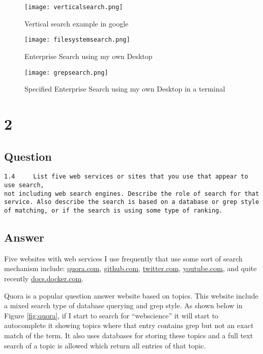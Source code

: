 \documentclass[letterpaper,11pt]{article}
\begin{document}
   \begin{figure}[h]
  \centering
  \texttt{[image: verticalsearch.png]}
  \caption{Vertical search example in google}
  \label{fig:verticalsearch}
  \end{figure}

   \clearpage
  \begin{figure}[h]
  \centering
  \texttt{[image: filesystemsearch.png]}
  \caption{Enterprise Search using my own Desktop}
  \label{fig:esearch1}
  \end{figure}

  \begin{figure}[h]
  \centering
  \texttt{[image: grepsearch.png]}
  \caption{Specified Enterprise Search using my own Desktop in a terminal}
  \label{fig:esearch2}
  \end{figure}


\clearpage


\section*{2}

\subsection*{Question}

\begin{verbatim}
1.4 	List five web services or sites that you use that appear to use search,
not including web search engines. Describe the role of search for that
service. Also describe the search is based on a database or grep style
of matching, or if the search is using some type of ranking.
\end{verbatim}

\subsection*{Answer}

Five websites with web services I use frequently that use some sort of search mechanism include: \url{quora.com}, \url{github.com}, \url{twitter.com}, \url{youtube.com}, and quite recently \url{docs.docker.com}.

Quora is a popular question answer website based on topics. This website include a mixed search type of database querying and grep style. As shown below in Figure \ref{fig:quora}, if I start to search for ``webscience'' it will start to autocomplete it showing topics where that entry contains grep but not an exact match of the term. It also uses databases for storing these topics and a full text search of a topic is allowed which return all entries of that topic.
\end{document}
